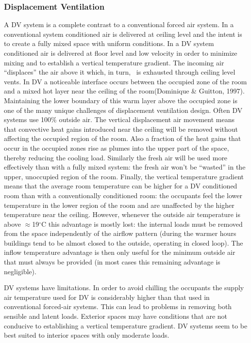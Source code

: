 {\subsubsection{Displacement Ventilation}\label{displacement-ventilation}

A DV system is a complete contrast to a conventional forced air system. In a conventional system conditioned air is delivered at ceiling level and the intent is to create a fully mixed space with uniform conditions. In a DV system conditioned air is delivered at floor level and low velocity in order to minimize mixing and to establish a vertical temperature gradient. The incoming air ``displaces'' the air above it which, in turn,~ is exhausted through ceiling level vents. In DV a noticeable interface occurs between the occupied zone of the room and a mixed hot layer near the ceiling of the room(Dominique \& Guitton, 1997). Maintaining the lower boundary of this warm layer above the occupied zone is one of the many unique challenges of displacement ventilation design. Often DV systems use 100\% outside air. The vertical displacement air movement means that convective heat gains introduced near the ceiling will be removed without affecting the occupied region of the room. Also a fraction of the heat gains that occur in the occupied zones rise as plumes into the upper part of the space, thereby reducing the cooling load. Similarly the fresh air will be used more effectively than with a fully mixed system: the fresh air won't be ``wasted'' in the upper, unoccupied region of the room. Finally, the vertical temperature gradient means that the average room temperature can be higher for a DV conditioned room than with a conventionally conditioned room: the occupants feel the lower temperature in the lower region of the room and are unaffected by the higher temperature near the ceiling. However, whenever the outside air temperature is above \(\approx\)19\(^{\circ}\)C this advantage is mostly lost: the internal loads must be removed from the space independently of the airflow pattern (during the warmer hours buildings tend to be almost closed to the outside, operating in closed loop). The inflow temperature advantage is then only useful for the minimum outside air that must always be provided (in most cases this remaining advantage is negligible).

DV systems have limitations. In order to avoid chilling the occupants the supply air temperature used for DV is considerably higher than that used in conventional forced-air systems. This can lead to problems in removing both sensible and latent loads. Exterior spaces may have conditions that are not conducive to establishing a vertical temperature gradient. DV systems seem to be best suited to interior spaces with only moderate loads.

}
